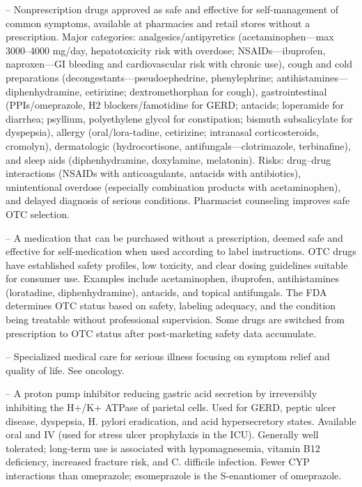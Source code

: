 -- Nonprescription drugs approved as safe and effective for self-management of common symptoms, available at pharmacies and retail stores without a prescription. Major categories: analgesics/antipyretics (acetaminophen—max 3000--4000 mg/day, hepatotoxicity risk with overdose; NSAIDs—ibuprofen, naproxen—GI bleeding and cardiovascular risk with chronic use), cough and cold preparations (decongestants—pseudoephedrine, phenylephrine; antihistamines—diphenhydramine, cetirizine; dextromethorphan for cough), gastrointestinal (PPIs/omeprazole, H2 blockers/famotidine for GERD; antacids; loperamide for diarrhea; psyllium, polyethylene glycol for constipation; bismuth subsalicylate for dyspepsia), allergy (oral/lora-tadine, cetirizine; intranasal corticosteroids, cromolyn), dermatologic (hydrocortisone, antifungals—clotrimazole, terbinafine), and sleep aids (diphenhydramine, doxylamine, melatonin). Risks: drug--drug interactions (NSAIDs with anticoagulants, antacids with antibiotics), unintentional overdose (especially combination products with acetaminophen), and delayed diagnosis of serious conditions. Pharmacist counseling improves safe OTC selection.

-- A medication that can be purchased without a prescription, deemed safe and effective for self-medication when used according to label instructions. OTC drugs have established safety profiles, low toxicity, and clear dosing guidelines suitable for consumer use. Examples include acetaminophen, ibuprofen, antihistamines (loratadine, diphenhydramine), antacids, and topical antifungals. The FDA determines OTC status based on safety, labeling adequacy, and the condition being treatable without professional supervision. Some drugs are switched from prescription to OTC status after post-marketing safety data accumulate.

-- Specialized medical care for serious illness focusing on symptom relief and quality of life. See oncology.

-- A proton pump inhibitor reducing gastric acid secretion by irreversibly inhibiting the H+/K+ ATPase of parietal cells. Used for GERD, peptic ulcer disease, dyspepsia, H. pylori eradication, and acid hypersecretory states. Available oral and IV (used for stress ulcer prophylaxis in the ICU). Generally well tolerated; long-term use is associated with hypomagnesemia, vitamin B12 deficiency, increased fracture risk, and C. difficile infection. Fewer CYP interactions than omeprazole; esomeprazole is the S-enantiomer of omeprazole.

